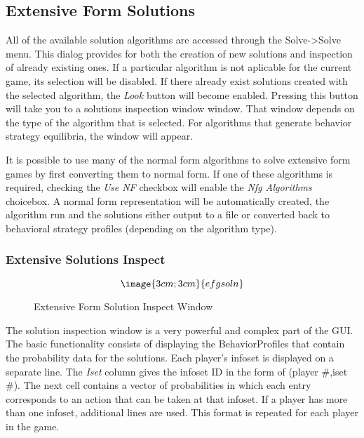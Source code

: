 
\subsection{Extensive Form Solutions}

All of the available solution algorithms are accessed through the
Solve->Solve menu.  This dialog provides for both the creation of new
solutions and inspection of already existing ones.  If a particular
algorithm is not aplicable for the current game, its selection will be
disabled.  If there already exist solutions created with the selected
algorithm, the {\em Look} button will become enabled.  Pressing this
button will take you to a solutions inspection window window.  That window
depends on the type of the algorithm that is selected.  For algorithms
that generate behavior strategy equilibria, the   window will appear.

It is possible to use many of the normal form algorithms to solve
extensive form games by first converting them to normal form.  If one of
these algorithms is required, checking the {\em Use NF} checkbox will
enable the {\em Nfg Algorithms} choicebox.  A normal form representation
will be automatically created, the algorithm run and the solutions either
output to a file or converted back to behavioral strategy profiles
(depending on the algorithm type).

\subsubsection{Extensive Solutions Inspect}\label{ExtensiveSolutionInspect}
\begin{figure}
$$\image{3cm;3cm}{efgsoln}$$
\caption{Extensive Form Solution Inspect Window}\label{fig:efgsoln}
\end{figure}

The solution inspection window is a very powerful and complex part of the GUI.
The basic functionality consists of displaying the BehaviorProfiles that contain the
probability data for the solutions.  Each player's infoset is displayed on a separate
line.  The {\em Iset} column gives the infoset ID in the form of (player \#,iset \#).
The next cell contains a vector of probabilities in which each entry corresponds to
an action that can be taken at that infoset.  If a player has more than one infoset,
additional lines are used.  This format is repeated for each player in the game.

